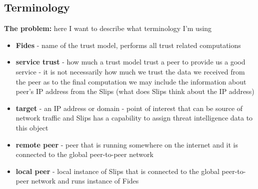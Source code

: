 \subsection{Terminology}
\textbf{The problem:} here I want to describe what terminology I'm using

\begin{itemize}
\item \textbf{Fides} - name of the trust model, performs all trust related computations
\item \textbf{service trust} - how much a trust model trust a peer to provide us a good service - it is not necessarily how much we trust the data we received from the peer as to the final computation we may include the information about peer's IP address from the Slips (what does Slips think about the IP address)
\item \textbf{target} - an IP address or domain - point of interest that can be source of network traffic and Slips has a capability to assign threat intelligence data to this object
\item \textbf{remote peer} - peer that is running somewhere on the internet and it is connected to the global peer-to-peer network
\item \textbf{local peer} - local instance of Slips that is connected to the global peer-to-peer network and runs instance of Fides
\end{itemize}